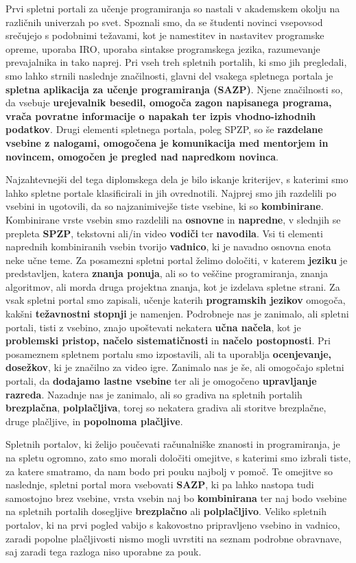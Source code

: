 Prvi spletni portali za učenje programiranja so nastali v akademskem
okolju na različnih univerzah po svet. Spoznali smo, da se študenti
novinci vsepovsod srečujejo s podobnimi težavami, kot je namestitev
in nastavitev programske opreme, uporaba IRO, uporaba sintakse
programskega jezika, razumevanje prevajalnika in tako
naprej. Pri vseh treh spletnih portalih, ki smo jih pregledali, smo
lahko strnili naslednje značilnosti, glavni del vsakega spletnega
portala je \textbf{spletna aplikacija za učenje programiranja
  (SAZP)}. Njene značilnosti so, da vsebuje \textbf{urejevalnik
  besedil, omogoča zagon napisanega programa, vrača povratne
  informacije o napakah ter izpis vhodno-izhodnih podatkov}. Drugi
elementi spletnega portala, poleg SPZP, so še \textbf{razdelane vsebine
  z nalogami, omogočena je komunikacija med mentorjem in novincem,
  omogočen je pregled nad napredkom novinca}.

Najzahtevnejši del tega diplomskega dela je bilo iskanje kriterijev, s
katerimi smo lahko spletne portale klasificirali in jih
ovrednotili. Najprej smo jih razdelili po vsebini in
ugotovili, da so najzanimivejše tiste vsebine, ki so
\textbf{kombinirane}. Kombinirane vrste vsebin smo razdelili na
\textbf{osnovne} in \textbf{napredne}, v slednjih se prepleta
\textbf{SPZP}, tekstovni ali/in video \textbf{vodiči} ter
\textbf{navodila}. Vsi ti elementi naprednih kombiniranih vsebin
tvorijo \textbf{vadnico}, ki je navadno osnovna enota neke učne teme.
Za posamezni spletni portal želimo določiti, v katerem \textbf{jeziku}
je predstavljen, katera \textbf{znanja ponuja}, ali so to veščine
programiranja, znanja algoritmov, ali morda druga projektna znanja,
kot je izdelava spletne strani. Za vsak spletni portal smo zapisali,
učenje katerih \textbf{programskih jezikov} omogoča, kakšni
\textbf{težavnostni stopnji} je namenjen. Podrobneje  nas je zanimalo,
ali spletni portali, tisti z vsebino, znajo upoštevati nekatera
\textbf{učna načela}, kot je \textbf{problemski pristop, načelo
  sistematičnosti} in \textbf{načelo postopnosti}. Pri posameznem
spletnem portalu smo izpostavili, ali ta uporablja \textbf{ocenjevanje,
dosežkov}, ki je značilno za video igre. Zanimalo nas je še, ali
omogočajo spletni portali, da \textbf{dodajamo lastne vsebine} ter ali je
omogočeno \textbf{upravljanje razreda}. Nazadnje nas je zanimalo, ali
so gradiva na spletnih portalih \textbf{brezplačna}, \textbf{polplačljiva}, torej so nekatera gradiva ali storitve brezplačne, druge
plačljive, in \textbf{popolnoma plačljive}.

Spletnih portalov, ki želijo poučevati računalniške znanosti in
programiranja, je na spletu ogromno, zato smo morali določiti
omejitve, s katerimi smo izbrali tiste, za katere smatramo, da nam bodo
pri pouku najbolj v pomoč. Te omejitve so naslednje, spletni portal
mora vsebovati \textbf{SAZP}, ki pa lahko nastopa tudi samostojno brez
vsebine, vrsta vsebin naj bo \textbf{kombinirana} ter naj bodo vsebine
na spletnih portalih dosegljive \textbf{brezplačno} ali \textbf{polplačljivo}. Veliko spletnih portalov, ki na prvi pogled vabijo s
kakovostno pripravljeno vsebino in vadnico, zaradi popolne
plačljivosti nismo mogli uvrstiti na seznam podrobne obravnave, saj
zaradi tega razloga niso uporabne za pouk.

